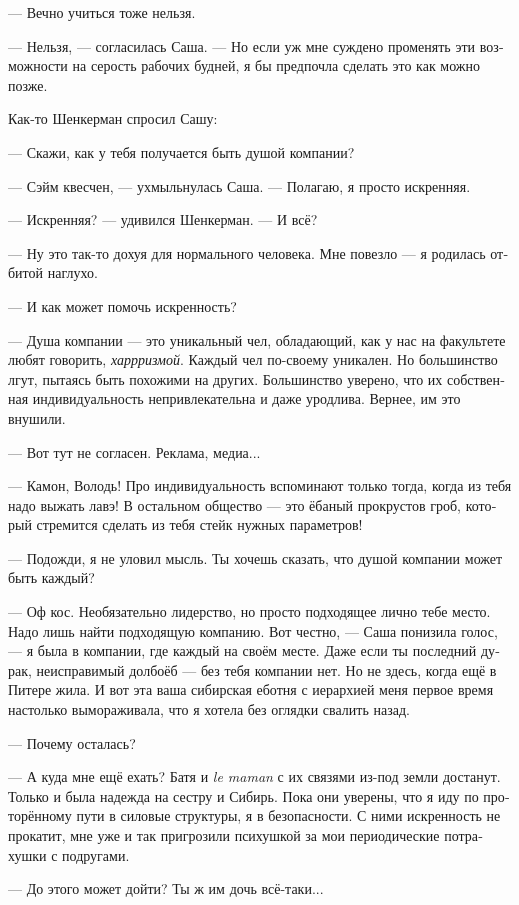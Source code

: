 \documentclass[a5paper,12pt,fleqn]{extbook}\usepackage{cooltooltips}\usepackage{polyglossia}\setdefaultlanguage[babelshorthands=true]{russian}\setotherlanguage{english}\defaultfontfeatures{Ligatures=TeX,Mapping=tex-text} \usepackage{xcolor}\definecolor{lightgray}{HTML}{bbbbbb}\color{lightgray}\newcommand{\ml}[3]{\textenglish{\textcolor{black}{#3}}}
\begin{document}
--- Вечно учиться тоже нельзя.

--- Нельзя, --- согласилась Саша.
--- Но если уж мне суждено променять эти возможности на серость рабочих будней, я бы предпочла сделать это как можно позже.

Как-то Шенкерман спросил Сашу:

--- Скажи, как у тебя получается быть душой компании?

--- Сэйм квесчен, --- ухмыльнулась Саша.
--- Полагаю, я просто искренняя.

--- Искренняя? --- удивился Шенкерман.
--- И всё?

--- Ну это так-то дохуя для нормального человека.
Мне повезло --- я родилась отбитой наглухо.

--- И как может помочь искренность?

--- Душа компании --- это уникальный чел, обладающий, как у нас на факультете любят говорить, \emph{харрризмой}.
Каждый чел по-своему уникален.
Но большинство лгут, пытаясь быть похожими на других.
Большинство уверено, что их собственная индивидуальность непривлекательна и даже уродлива.
Вернее, им это внушили.

--- Вот тут не согласен.
Реклама, медиа...

--- Камон, Володь!
Про индивидуальность вспоминают только тогда, когда из тебя надо выжать лавэ!
В остальном общество --- это ёбаный прокрустов гроб, который стремится сделать из тебя стейк нужных параметров!

--- Подожди, я не уловил мысль.
Ты хочешь сказать, что душой компании может быть каждый?

--- Оф кос.
Необязательно лидерство, но просто подходящее лично тебе место.
Надо лишь найти подходящую компанию.
Вот честно, --- Саша понизила голос, --- я была в компании, где каждый на своём месте.
Даже если ты последний дурак, неисправимый долбоёб --- без тебя компании нет.
Но не здесь, когда ещё в Питере жила.
И вот эта ваша сибирская еботня с иерархией меня первое время настолько вымораживала, что я хотела без оглядки свалить назад.

--- Почему осталась?

--- А куда мне ещё ехать?
Батя и \textit{le maman} с их связями из-под земли достанут.
Только и была надежда на сестру и Сибирь.
Пока они уверены, что я иду по проторённому пути в силовые структуры, я в безопасности.
С ними искренность не прокатит, мне уже и так пригрозили психушкой за мои периодические потрахушки с подругами.

--- До этого может дойти?
Ты ж им дочь всё-таки...
\end{document}
